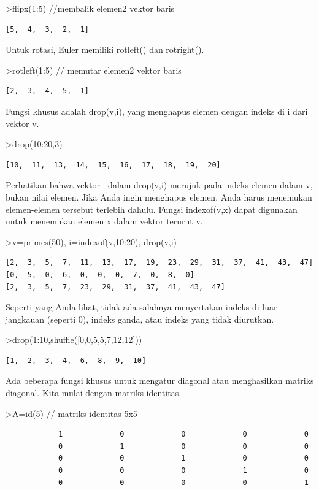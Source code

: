 \documentclass[
]{book}
\begin{document}
\textgreater flipx(1:5) //membalik elemen2 vektor baris

\begin{verbatim}
[5,  4,  3,  2,  1]
\end{verbatim}

Untuk rotasi, Euler memiliki rotleft() dan rotright().

\textgreater rotleft(1:5) // memutar elemen2 vektor baris

\begin{verbatim}
[2,  3,  4,  5,  1]
\end{verbatim}

Fungsi khusus adalah drop(v,i), yang menghapus elemen dengan indeks di i dari vektor v.

\textgreater drop(10:20,3)

\begin{verbatim}
[10,  11,  13,  14,  15,  16,  17,  18,  19,  20]
\end{verbatim}

Perhatikan bahwa vektor i dalam drop(v,i) merujuk pada indeks elemen dalam v, bukan nilai elemen. Jika Anda ingin menghapus elemen, Anda harus menemukan elemen-elemen tersebut terlebih dahulu. Fungsi indexof(v,x) dapat digunakan untuk menemukan elemen x dalam vektor terurut v.

\textgreater v=primes(50), i=indexof(v,10:20), drop(v,i)

\begin{verbatim}
[2,  3,  5,  7,  11,  13,  17,  19,  23,  29,  31,  37,  41,  43,  47]
[0,  5,  0,  6,  0,  0,  0,  7,  0,  8,  0]
[2,  3,  5,  7,  23,  29,  31,  37,  41,  43,  47]
\end{verbatim}

Seperti yang Anda lihat, tidak ada salahnya menyertakan indeks di luar jangkauan (seperti 0), indeks ganda, atau indeks yang tidak diurutkan.

\textgreater drop(1:10,shuffle({[}0,0,5,5,7,12,12{]}))

\begin{verbatim}
[1,  2,  3,  4,  6,  8,  9,  10]
\end{verbatim}

Ada beberapa fungsi khusus untuk mengatur diagonal atau menghasilkan matriks diagonal. Kita mulai dengan matriks identitas.

\textgreater A=id(5) // matriks identitas 5x5

\begin{verbatim}
            1             0             0             0             0 
            0             1             0             0             0 
            0             0             1             0             0 
            0             0             0             1             0 
            0             0             0             0             1 
\end{verbatim}
\end{document}
